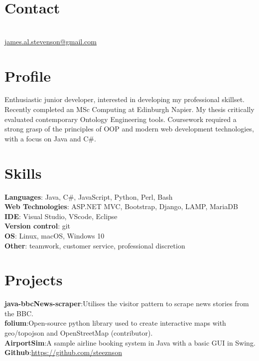 \documentclass[12pt, a4paper]{article}
\begin{document}
\par{\bigskip\par}
\section{Contact}
\large{}\\
\href{mailto:james.al.stevenson@gmail.com}{james.al.stevenson@gmail.com}\\

\begin{multicols}{2}

\section{Profile}
Enthusiastic junior developer, interested in developing my professional skillset.\\  
Recently completed an MSc Computing at Edinburgh Napier.
My thesis critically evaluated contemporary Ontology Engineering tools.
Coursework required a strong grasp of the principles of OOP and modern web development technologies, with a focus on Java and C\#.\\

\section{Skills}
\small
\textbf{Languages}: Java, C\#, JavaScript, Python, Perl, Bash\\
\textbf{Web Technologies}: ASP.NET MVC, Bootstrap, Django, LAMP, MariaDB\\
\textbf{IDE}: Visual Studio, VScode, Eclipse\\
\textbf{Version control}: git\\
\textbf{OS}: Linux, macOS, Windows 10\\
\textbf{Other}: teamwork, customer service, professional discretion\\

\section{Projects}
\textbf{java-bbcNews-scraper}:Utilises the visitor pattern to scrape news stories from the BBC.\\
\textbf{folium}:Open-source python library used to create interactive maps with geo/topojson and OpenStreetMap (contributor).\\
\textbf{AirportSim}:A sample airline booking system in Java with a basic GUI in Swing.\\
\textbf{Github}:\url{https://github.com/steeznson}


\end{multicols}
\end{document}

